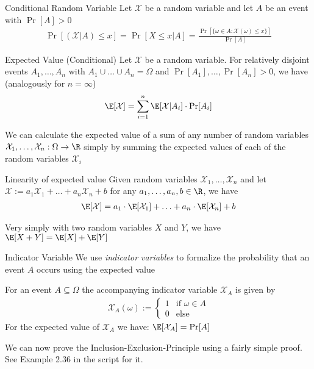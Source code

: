 \newpage
{}

\begin{definition}[]{Conditional Random Variable}
    Let $\mathcal{X}$ be a random variable and let $A$ be an event with $\Pr[A] > 0$
    \begin{align*}
        \Pr[(\mathcal{X} | A) \leq x] = \Pr[X \leq x | A] = \frac{\Pr[\{\omega \in A : \mathcal{X}(\omega) \leq x\}]}{\Pr[A]}
    \end{align*}
\end{definition}

\begin{theorem}[]{Expected Value (Conditional)}
    Let $\mathcal{X}$ be a random variable. For relatively disjoint events $A_1, \ldots, A_n$ with $A_1 \cup \ldots \cup A_n = \Omega$ and $\Pr[A_1], \ldots, \Pr[A_n] > 0$, we have (analogously for $n = \infty$)
    \begin{align*}
        \E[\mathcal{X}] = \sum_{i = 1}^{n} \E[\mathcal{X} | A_i] \cdot \Pr[A_i]
    \end{align*}
\end{theorem}


We can calculate the expected value of a sum of any number of random variables $\mathcal{X}_1, \ldots, \mathcal{X}_n : \Omega \rightarrow \R$ simply by summing the expected values of each of the random variables $\mathcal{X}_i$

\begin{theorem}[]{Linearity of expected value}
    Given random variables $\mathcal{X}_1, \ldots, \mathcal{X}_n$ and let $\mathcal{X} := a_1 \mathcal{X}_1 + \ldots + a_n \mathcal{X}_n + b$ for any $a_1, \ldots, a_n, b \in \R$, we have
    \begin{align*}
        \E[\mathcal{X}] = a_1 \cdot \E[\mathcal{X}_1] + \ldots + a_n \cdot \E[\mathcal{X}_n] + b
    \end{align*}
\end{theorem}

Very simply with two random variables $X$ and $Y$, we have $\E[X + Y] = \E[X] + \E[Y]$

\setcounter{all}{35}
\begin{definition}[]{Indicator Variable}
    We use \textit{indicator variables} to formalize the probability that an event $A$ occurs using the expected value

    For an event $A \subseteq \Omega$ the accompanying indicator variable $\mathcal{X}_A$ is given by
    \begin{align*}
        \mathcal{X}_A(\omega) := \begin{cases}
                                     1 & \text{if } \omega \in A \\
                                     0 & \text{else }
                                 \end{cases}
    \end{align*}
    For the expected value of $\mathcal{X}_A$ we have: $\E[\mathcal{X}_A] = \Pr[A]$
\end{definition}
We can now prove the Inclusion-Exclusion-Principle using a fairly simple proof. See Example 2.36 in the script for it.

